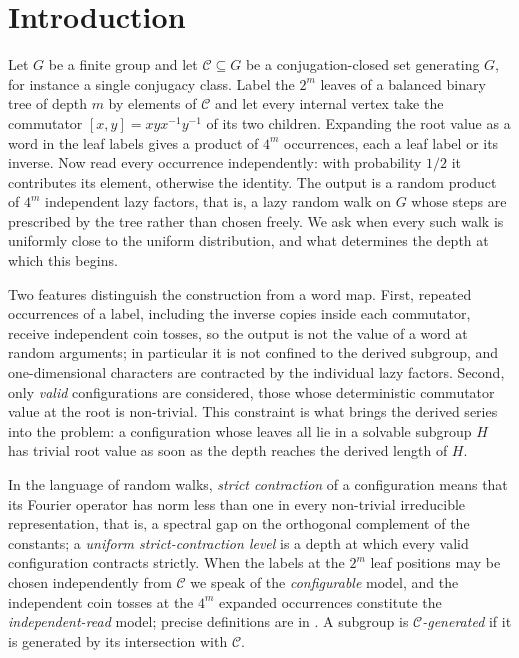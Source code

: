 \section{Introduction}
\label{sec:intro}

Let $G$ be a finite group and let $\mathcal C\subseteq G$ be a
conjugation-closed set generating $G$, for instance a single conjugacy
class. Label the $2^m$ leaves of a balanced binary tree of depth $m$ by
elements of $\mathcal C$ and let every internal vertex take the commutator
$[x,y]=xyx^{-1}y^{-1}$ of its two children. Expanding the root value as a
word in the leaf labels gives a product of $4^m$ occurrences, each a leaf
label or its inverse. Now read every occurrence independently: with
probability $1/2$ it contributes its element, otherwise the identity. The
output is a random product of $4^m$ independent lazy factors, that is, a
lazy random walk on $G$ whose steps are prescribed by the tree rather than
chosen freely. We ask when every such walk is uniformly close to the
uniform distribution, and what determines the depth at which this begins.

Two features distinguish the construction from a word map. First,
repeated occurrences of a label, including the inverse copies inside each
commutator, receive independent coin tosses, so the output is not the
value of a word at random arguments; in particular it is not confined to
the derived subgroup, and one-dimensional characters are contracted by
the individual lazy factors. Second, only \emph{valid} configurations are
considered, those whose deterministic commutator value at the root is
non-trivial. This constraint is what brings the derived series into the
problem: a configuration whose leaves all lie in a solvable subgroup $H$
has trivial root value as soon as the depth reaches the derived length of
$H$.

In the language of random walks, \emph{strict contraction} of a
configuration means that its Fourier operator has norm less than one in
every non-trivial irreducible representation, that is, a spectral gap on
the orthogonal complement of the constants; a \emph{uniform
strict-contraction level} is a depth at which every valid configuration
contracts strictly. When the labels at the $2^m$ leaf positions may be
chosen independently from $\mathcal C$ we speak of the \emph{configurable}
model, and the independent coin tosses at the $4^m$ expanded occurrences
constitute the \emph{independent-read} model; precise definitions are in
. A subgroup is \emph{$\mathcal C$-generated} if it is
generated by its intersection with $\mathcal C$.

